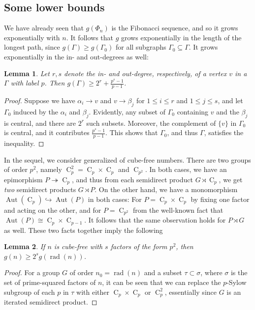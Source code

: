\documentclass[a4paper, 12pt]{article}
\newcommand{\aut}[1]{\operatorname{Aut}(#1)}
\newcommand{\cyc}[1]{\operatorname{C}_{#1}}
\theoremstyle{plain}
\newtheorem{lem}{Lemma}[section]
\theoremstyle{definition}
\begin{document}
\subsection{Some lower bounds}
We have already seen that $g(\Phi_n)$ is the Fibonacci sequence, and so it grows exponentially with $n$. It follows that $g$ grows exponentially in the length of the longest path, since $g(\Gamma) \ge  g(\Gamma_0)$ for all subgraphs $\Gamma_0 \subseteq \Gamma$. It grows exponentially in the in- and out-degrees as well:
\begin{lem}
	Let $r, s$ denote the in- and out-degree, respectively, of a vertex $v$ in a  $\Gamma$ with label $p$. Then $g(\Gamma) \ge 2^r + \frac{p^s - 1}{p - 1}$.
\end{lem}
\begin{proof}
	Suppose we have $\alpha_i \rightarrow v$ and $v \rightarrow \beta_j$ for $1 \le i \le r$ and $1 \le j \le s$, and let $\Gamma_0$ induced by the $\alpha_i$ and $\beta_j$. Evidently, any subset of $\Gamma_0$ containing $v$ and the $\beta_j$ is central, and there are $2^r$ such subsets. Moreover, the complement of $\{v\}$ in $\Gamma_0$ is central, and it contributes \nolinebreak[4] $\frac{p^s - 1}{p - 1}$. This shows that $\Gamma_0$, and thus $\Gamma$, satisfies the inequality.
\end{proof}	
In the sequel, we consider generalized  of cube-free numbers. There are two groups of order $p^2$, namely $\cyc{p}^2 = \cyc{p} \times \cyc{p}$ and $\cyc{p^2}$. In both cases, we have an epimorphism $P \twoheadrightarrow \cyc{p}$, and thus from each semidirect product $G \rtimes \cyc{p}$, we get \textit{two} semidirect products $G \rtimes P$. On the other hand, we have a monomorphism $\aut{\cyc{p}} \hookrightarrow \aut{P}$ in both cases: For $P = \cyc{p} \times \cyc{p}$ by fixing one factor and acting on the other, and for $P = \cyc{p^2}$ from the well-known fact that $\aut{P} \cong \cyc{p} \times \cyc{p - 1}$. It follows that the same observation holds for $P \rtimes G$ as well. These two facts together imply the following
\begin{lem}
	If $n$ is cube-free with $s$ factors of the form $p^2$, then $g(n) \ge 2^s g(\operatorname{rad}(n))$.
\end{lem}
\begin{proof}
	For a group $G$ of order $n_0 = \operatorname{rad}(n)$ and a subset $\tau \subset \sigma$, where $\sigma$ is the set of prime-squared factors of $n$, it can be seen that we can replace the $p$-Sylow subgroup of each $p$ in $\tau$ with either $\cyc{p} \times \cyc{p}$ or $\cyc{p}^2$, essentially since $G$ is an iterated semidirect product.
\end{proof}
\end{document}
